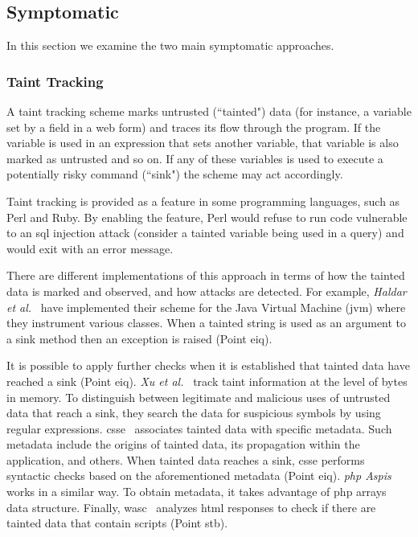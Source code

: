 \documentclass[conference]{IEEEtran}
\begin{document}
\subsection{Symptomatic}

In this section we examine the two main symptomatic
approaches.

\subsubsection{Taint Tracking}
\label{sec:taint}

A taint tracking scheme marks untrusted
(``tainted") data (for instance, a variable set
by a field in a web form) and traces its flow through
the program. If the variable is used in an expression
that sets another variable, that variable is also
marked as untrusted and so on. If any of these variables
is used to execute a potentially risky command (``sink") the
scheme may act accordingly.

Taint tracking is provided as a feature in some programming languages,
such as Perl and Ruby. By enabling the feature, Perl would refuse to
run code vulnerable to an {\sc sql} injection attack (consider a
tainted variable being used in a query) and would exit with an error
message.

There are different implementations of this approach
in terms of how the tainted data is marked and observed,
and how attacks are detected.
For example, {\it Haldar et al.}~\cite{HCF05} have implemented
their scheme for the Java Virtual Machine ({\sc jvm})
where they instrument various classes. When a
tainted string is used as an argument to a sink method
then an exception is raised (Point {\sc e}i{\sc q}).

It is possible to apply further checks when it is established that
tainted data have reached a sink (Point {\sc e}i{\sc q}). {\it Xu et
  al.}~\cite{XBS06} track taint information at the level of bytes in
memory. To distinguish between legitimate and malicious uses of
untrusted data that reach a sink, they search the data for suspicious
symbols by using regular expressions. {\sc csse}~\cite{PB05}
associates tainted data with specific metadata. Such metadata include
the origins of tainted data, its propagation within the application,
and others. When tainted data reaches a sink, {\sc csse} performs
syntactic checks based on the aforementioned metadata (Point {\sc e}i{\sc q}).
{\it {\sc php} Aspis}~\cite{PMP11} works in a similar way. To obtain
metadata, it takes advantage of {\sc php} arrays data structure.
Finally, {\sc wasc}~\cite{NLC07} analyzes {\sc html} responses to check
if there are tainted data that contain scripts (Point {\sc s}t{\sc b}).
\end{document}
